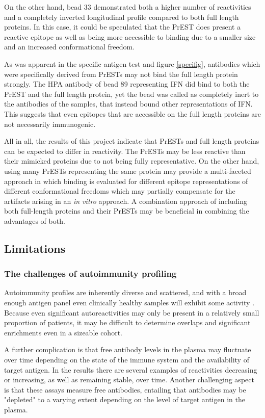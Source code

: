 \documentclass{article}
\begin{document}
On the other hand, bead 33 demonstrated both a higher number of reactivities and a completely inverted longitudinal profile compared to both full length proteins. In this case, it could be speculated that the PrEST does present a reactive epitope as well as being more accessible to binding due to a smaller size and an increased conformational freedom.

As was apparent in the specific antigen test and figure \ref{specifig}, antibodies which were specifically derived from PrESTs may not bind the full length protein strongly. The HPA antibody of bead 89 representing IFN\textomega{} did bind to both the PrEST and the full length protein, yet the bead was called as completely inert to the antibodies of the samples, that instead bound other representations of IFN\textomega. This suggests that even epitopes that are accessible on the full length proteins are not necessarily immunogenic.

All in all, the results of this project indicate that PrESTs and full length proteins can be expected to differ in reactivity. The PrESTs may be less reactive than their mimicked proteins due to not being fully representative. On the other hand, using many PrESTs representing the same protein may provide a multi-faceted approach in which binding is evaluated for different epitope representations of different conformational freedoms which may partially compensate for the artifacts arising in an \textit{in vitro} approach. A combination approach of including both full-length proteins and their PrESTs may be beneficial in combining the advantages of both. 

\subsection{Limitations}
\subsubsection{The challenges of autoimmunity profiling}
Autoimmunity profiles are inherently diverse and scattered, and with a broad enough antigen panel even clinically healthy samples will exhibit some activity \cite{aa_healthy}. Because even significant autoreactivities may only be present in a relatively small proportion of patients, it may be difficult to determine overlaps and significant enrichments even in a sizeable cohort.

A further complication is that free antibody levels in the plasma may fluctuate over time depending on the state of the immune system and the availability of target antigen. In the results there are several examples of reactivities decreasing or increasing, as well as remaining stable, over time. Another challenging aspect is that these assays measure free antibodies, entailing that antibodies may be "depleted" to a varying extent depending on the level of target antigen in the plasma.
\end{document}
